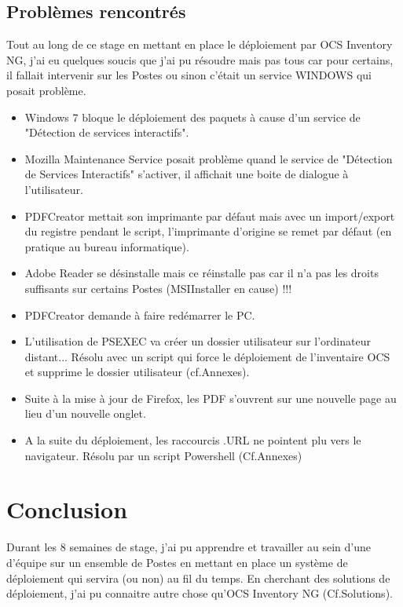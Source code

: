\documentclass[11pt,a4paper,oneside]{article}
\begin{document}
\subsection{Problèmes rencontrés}
Tout au long de ce stage en mettant en place le déploiement par OCS Inventory NG, j'ai eu quelques soucis que j'ai pu résoudre mais pas tous car pour certains, il fallait intervenir sur les Postes ou sinon c'était un service WINDOWS qui posait problème.
\\
\begin{itemize}
\item Windows 7 bloque le déploiement des paquets à cause d'un service de "Détection de services interactifs".
\item Mozilla Maintenance Service posait problème quand le service de "Détection de Services Interactifs" s'activer, il affichait une boite de dialogue à l'utilisateur.
\item PDFCreator mettait son imprimante par défaut mais avec un import/export du registre pendant le script, l'imprimante d'origine se remet par défaut (en pratique au bureau informatique).
\item  Adobe Reader se désinstalle mais ce réinstalle pas car il n'a pas les droits suffisants sur certains Postes (MSIInstaller en cause) !!!
\item PDFCreator demande à faire redémarrer le PC.
\item L'utilisation de PSEXEC va créer un dossier utilisateur sur l'ordinateur distant... Résolu avec un script qui force le déploiement de l'inventaire OCS et supprime le dossier utilisateur (cf.Annexes).
\item Suite à la mise à jour de Firefox, les PDF s'ouvrent sur une nouvelle page au lieu d'un nouvelle onglet.
\item A la suite du déploiement, les raccourcis .URL ne pointent plu vers le navigateur. Résolu par un script Powershell (Cf.Annexes)
\end{itemize}

\section{Conclusion}
Durant les 8 semaines de stage, j'ai pu apprendre et travailler au sein d'une d'équipe sur un ensemble de Postes en mettant en place un système de déploiement qui servira (ou non) au fil du temps. En cherchant des solutions de déploiement, j'ai pu connaitre autre chose qu'OCS Inventory NG (Cf.Solutions).
\end{document}
